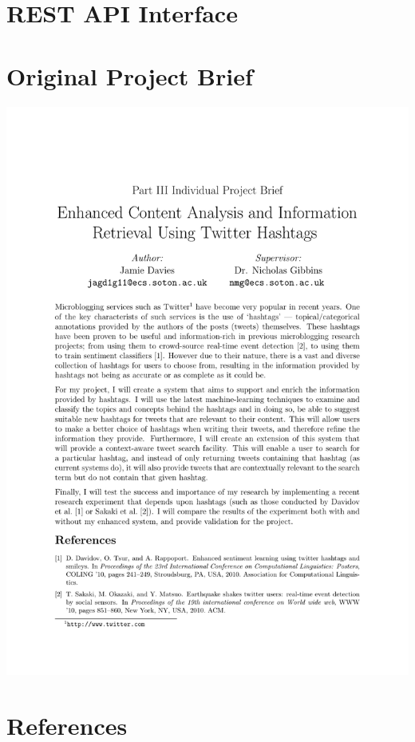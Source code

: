 \documentclass[11pt,a4paper]{report}
\begin{document}
\begin{appendices}
\pagebreak

\chapter{REST API Interface}
\pagebreak

\chapter{Original Project Brief}
\vspace*{-3cm}
\hspace*{-2.4cm}\includegraphics[scale=0.9]{../brief/brief.pdf}
\end{appendices}
\pagebreak

\setcounter{secnumdepth}{0}
\chapter{References}
{\footnotesize \printbibliography[heading=none]}
\end{document}
